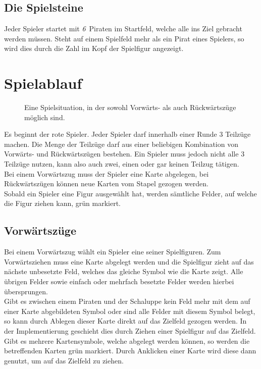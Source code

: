 \documentclass[a4paper, ngerman]{scrartcl}
\newcommand{\PiratenAnzahl}{\emph{6}}
\begin{document}
\subsection{Die Spielsteine}
Jeder Spieler startet mit \PiratenAnzahl\ Piraten im Startfeld, welche alle ins
Ziel gebracht werden müssen. Steht auf einem Spielfeld mehr als ein Pirat eines
Spielers, so wird dies durch die Zahl im Kopf der Spielfigur angezeigt.

	

\section{Spielablauf}	
	\begin{figure}[h]
		\centering
		\caption{Eine Spielsituation, in der sowohl Vorwärts- als auch Rückwärtszüge
		möglich sind.}
		\label{fig:PossibleMoves}
	\end{figure}	
	Es beginnt der rote Spieler. Jeder Spieler darf innerhalb einer Runde 3
	Teilzüge machen. Die Menge der Teilzüge darf aus einer beliebigen Kombination
	von Vorwärts- und Rückwärtszügen bestehen. Ein Spieler muss jedoch nicht alle 3
	Teilzüge nutzen, kann also auch zwei, einen oder gar keinen Teilzug tätigen.\\
	Bei einem Vorwärtszug muss der Spieler eine Karte  abgelegen, bei
	Rückwärtszügen können neue Karten vom Stapel gezogen werden.\\
	Sobald ein Spieler eine Figur ausgewählt hat, werden sämtliche Felder, auf
	welche die Figur ziehen kann, grün markiert.
	
	
	
	\subsection{Vorwärtszüge}
	Bei einem Vorwärtszug wählt ein Spieler eine seiner
	Spiel\-figuren. Zum Vorwärtsziehen muss eine Karte
	abgelegt werden und die Spielfigur zieht auf das nächste unbesetzte Feld,
	welches das gleiche Symbol wie die Karte zeigt. Alle übrigen Felder sowie
	einfach oder mehrfach besetzte Felder werden hierbei übersprungen.\\
	Gibt es zwischen einem Piraten und der Schaluppe kein Feld mehr mit dem auf
	einer Karte abgebildeten Symbol oder sind alle Felder mit diesem Symbol
	belegt, so kann durch Ablegen dieser Karte direkt auf das Zielfeld gezogen
	werden. In der Implementierung geschieht dies durch Ziehen einer Spielfigur auf
	das Zielfeld. Gibt es mehrere Kartensymbole, welche abgelegt werden können, so
	werden die betreffenden Karten grün markiert. Durch Anklicken einer Karte wird
	diese dann genutzt, um auf das Zielfeld zu ziehen.
	
\end{document}
